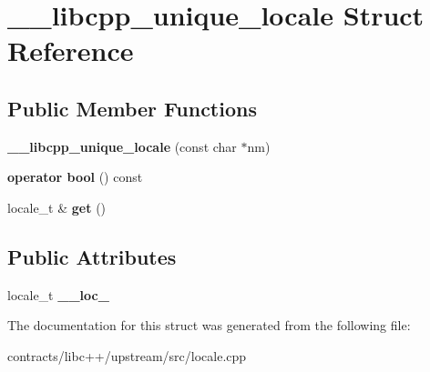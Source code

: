 \hypertarget{struct____libcpp__unique__locale}{}\section{\+\_\+\+\_\+libcpp\+\_\+unique\+\_\+locale Struct Reference}
\label{struct____libcpp__unique__locale}
\subsection*{Public Member Functions}
\begin{DoxyCompactItemize}
\item 
\mbox{\label{struct____libcpp__unique__locale_adf2752c4d57d4e1d322bfc70ccead0f9}} 
{\bfseries \+\_\+\+\_\+libcpp\+\_\+unique\+\_\+locale} (const char $\ast$nm)
\item 
\mbox{\label{struct____libcpp__unique__locale_a120d30540b0de6a3cc90bfc41be48e06}} 
{\bfseries operator bool} () const
\item 
\mbox{\label{struct____libcpp__unique__locale_a8edca0350e08dc0db9132bb8a9c189e3}} 
locale\+\_\+t \& {\bfseries get} ()
\end{DoxyCompactItemize}
\subsection*{Public Attributes}
\begin{DoxyCompactItemize}
\item 
\mbox{\label{struct____libcpp__unique__locale_a5da3a6ee9ea7236a347885bbe154c37a}} 
locale\+\_\+t {\bfseries \+\_\+\+\_\+loc\+\_\+}
\end{DoxyCompactItemize}


The documentation for this struct was generated from the following file\+:\begin{DoxyCompactItemize}
\item 
contracts/libc++/upstream/src/locale.\+cpp\end{DoxyCompactItemize}
